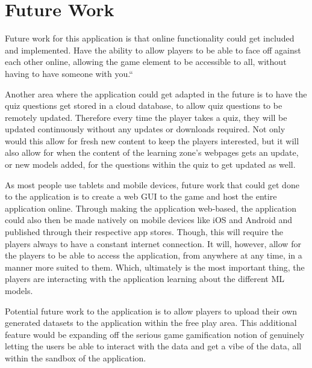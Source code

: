 	\section{Future Work} %
		Future work for this application is that online functionality could get included and implemented. Have the ability to allow players to be able to face off against each other online, allowing the game element to be accessible to all, without having to have someone with you.``
		
		Another area where the application could get adapted in the future is to have the quiz questions get stored in a cloud database, to allow quiz questions to be remotely updated. Therefore every time the player takes a quiz, they will be updated continuously without any updates or downloads required. Not only would this allow for fresh new content to keep the players interested, but it will also allow for when the content of the learning zone's webpages gets an update, or new models added, for the questions within the quiz to get updated as well.
		
		As most people use tablets and mobile devices, future work that could get done to the application is to create a web GUI to the game and host the entire application online. Through making the application web-based, the application could also then be made natively on mobile devices like iOS and Android and published through their respective app stores. Though, this will require the players always to have a constant internet connection. It will, however, allow for the players to be able to access the application, from anywhere at any time, in a manner more suited to them. Which, ultimately is the most important thing, the players are interacting with the application learning about the different ML models.
		
		Potential future work to the application is to allow players to upload their own generated datasets to the application within the free play area. This additional feature would be expanding off the serious game gamification notion of genuinely letting the users be able to interact with the data and get a vibe of the data, all within the sandbox of the application. 


